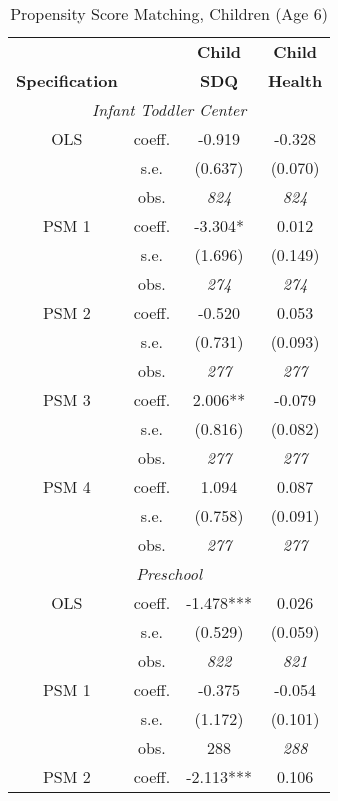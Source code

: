 \begin{table}[H]
\caption{Propensity Score Matching, Children (Age 6)}
\label{tab:PSM_children}
\vspace{-5mm}
\begin{center}
\begin{tabular}{ c c c c }
\hline\hline
                       & & \textbf{Child} & \textbf{Child} \\
\textbf{Specification} & & \textbf{SDQ}   & \textbf{Health} \\
\hline 
\multicolumn{4}{c}{\emph{Infant Toddler Center }}\\ [0.2em]
\hline 
OLS   & coeff.  & -0.919 & -0.328\\ [0.2em]
      & s.e.    & (0.637)  & (0.070) \\ [0.2em]
      & obs.    &  \emph{824} & \emph{824} \\ [0.2em]
PSM 1 & coeff.  & -3.304{*} & 0.012\\ [0.2em]
      & s.e.    & (1.696)  & (0.149) \\ [0.2em]
      & obs.    &  \emph{274} & \emph{274} \\ [0.2em]
 PSM 2 & coeff.  & -0.520 & 0.053\\ [0.2em]
  & s.e.  & (0.731)  & (0.093) \\ [0.2em]
  & obs.  &  \emph{277} & \emph{277} \\ [0.2em]
 PSM 3 & coeff.  & 2.006{*}{*} & -0.079\\ [0.2em]
  & s.e.  & (0.816)  & (0.082) \\ [0.2em]
  & obs.  &  \emph{277} & \emph{277} \\ [0.2em]
 PSM 4 & coeff.  & 1.094 & 0.087\\ [0.2em]
  & s.e.  & (0.758)  & (0.091) \\ [0.2em]
  & obs.  &  \emph{277} & \emph{277} \\ [0.2em]
\hline 
\multicolumn{4}{c}{\emph{Preschool}}\\ [0.2em]
\hline 
OLS  & coeff.  & -1.478{*}{*}{*} & 0.026\\ [0.2em]
  & s.e.  & (0.529)  & (0.059) \\ [0.2em]
  & obs.  &  \emph{822} & \emph{821} \\ [0.2em]
 PSM 1 & coeff.  & -0.375 & -0.054\\ [0.2em]
  & s.e.  & (1.172)  & (0.101) \\ [0.2em]
  & obs.  &  288 & \emph{288} \\ [0.2em]
 PSM 2 & coeff.  & -2.113{*}{*}{*} & 0.106\\ [0.2em]

\end{tabular}
\end{center}
\end{table}
